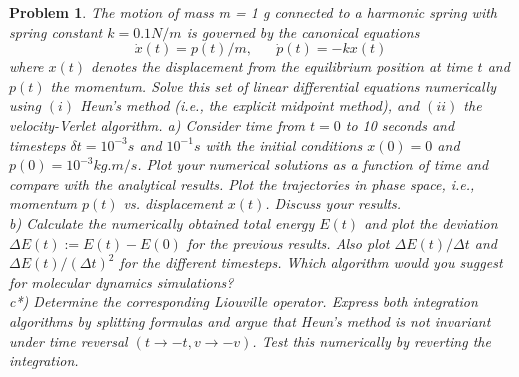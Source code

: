 \documentclass[12pt]{article}
\renewcommand{\=}[1]{\stackrel{#1}{=}} %
\newtheorem{p}{Problem}[section]
\theoremstyle{definition}
\begin{document}
\begin{p} The motion of mass m = 1 g connected to a harmonic spring with spring constant $k = 0.1 N/m$ is governed by the canonical equations
\begin{equation}
   \dot{x}(t) = p(t) / m, \; \; \; \; \; \; \dot{p}(t) = -kx(t)
\end{equation}
where $x(t)$ denotes the displacement from the equilibrium position at time $t$ and $p(t)$ the momentum. Solve this set of linear differential equations numerically using $(i)$ Heun's method (i.e., the explicit midpoint method), and $(ii)$ the velocity-Verlet algorithm. 
\bigbreak
 a) Consider time from $t=0 $ to 10 seconds and timesteps $\delta t = 10^{-3}s $ and $10^{-1}s$ with the initial conditions $x(0)=0 $ and $p(0)=10^{-3} kg. m/s $. Plot your numerical solutions as a function of time and compare with the analytical results. Plot the trajectories in phase space, i.e., momentum $p(t) $ vs. displacement $x(t) $. Discuss your results. \\
 \vskip 0.1in
 b) Calculate the numerically obtained total energy $E(t)$ and plot the deviation $\Delta E(t) := E(t) - E(0)$ for the previous results. Also plot $\Delta E(t) / \Delta t$ and $\Delta E(t) / (\Delta t)^2$ for the different timesteps. Which algorithm would you suggest for molecular dynamics simulations?\\
 \vskip 0.1in
 c*) Determine the corresponding Liouville operator. Express both integration algorithms by splitting formulas and argue that Heun's method is not invariant under time reversal $(t \rightarrow -t, v \rightarrow -v)$. Test this numerically by reverting the integration.

\end{p}
\end{document}
